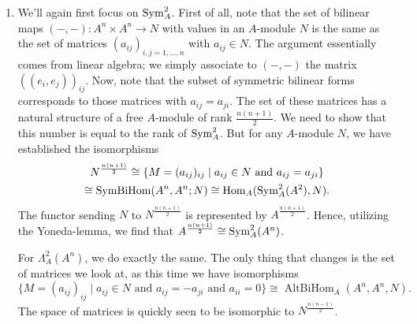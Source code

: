 \documentclass[a4paper,11pt]{article}
\begin{document}
\begin{enumerate}
    \item We'll again first focus on $\operatorname{Sym}^2_A$. First of all, note that the set of
        bilinear maps $(-,-): A^n \times A^n \to N$ with values in an $A$-module $N$ 
        is the same as the set of matrices $(a_{ij})_{i,j = 1, \dots, n}$ 
        with $a_{ij} \in N$. The argument essentially comes from linear algebra; 
        we simply associate to $(-,-)$ the matrix $((e_i, e_j))_{ij}$. 
        Now, note that the subset of symmetric bilinear forms corresponds to those
        matrices with $a_{ij} = a_{ji}$. The set of these matrices has a
        natural structure of a free $A$-module of rank $\frac{n(n+1)}2$. We
        need to show that this number is equal to the rank of $\operatorname{Sym}^2_A$. 
        But for any $A$-module $N$, we have established the isomorphisms
        \begin{multline*}
            N^{\frac{n(n+1)}2} \cong \{M = (a_{ij})_{ij} \mid a_{ij} \in N \text{ and
            } a_{ij} = a_{ji} \}\\ \cong \operatorname{SymBiHom}(A^n, A^n; N)
            \cong \operatorname{Hom}_A(\operatorname{Sym}^2_A(A^2) , N).
        \end{multline*}
        The functor sending $N$ to $N^{\frac{n(n+1)}2}$ is represented by 
        $A^{\frac{n(n+1)}2}$. Hence, utilizing the Yoneda-lemma, we find that 
        $A^{\frac{n(n+1)}2} \cong \operatorname{Sym}^2_A(A^n)$. 

        For $\Lambda^2_A(A^n)$, we do exactly the same. The only thing that 
        changes is the set of matrices we look at, as this time we have
        isomorphisms
        \begin{equation*}
            \{M = (a_{ij})_{ij} \mid a_{ij} \in N \text{ and
            } a_{ij} = - a_{ji} \text{ and } a_{ii} = 0\} \cong 
            \operatorname{AltBiHom}_A(A^n, A^n, N).
        \end{equation*}
        The space of matrices is quickly seen to be isomorphic to
        $N^{\frac{n(n-1)}2}$. 
        



\end{enumerate}


\contactend
\end{document}
